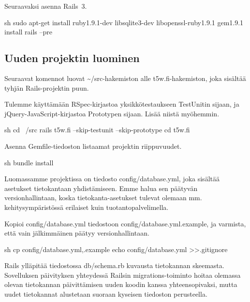 \documentclass{article}
\newcommand{\en}[1]{\foreignlanguage{english}{#1}}
\begin{document}
\begin{samepage}
Seuraavaksi asenna Rails~3.

\begin{pygmented}{sh}
sudo apt-get install ruby1.9.1-dev libsqlite3-dev libopenssl-ruby1.9.1
gem1.9.1 install rails --pre
\end{pygmented}
\end{samepage}

\subsection{Uuden projektin luominen}

\begin{samepage}
Seuraavat komennot luovat \textasciitilde/src-hakemiston alle
t5w.fi-hakemiston, joka sisältää tyhjän Rails-projektin puun.

Tulemme käyttämään RSpec-kirjastoa yksikkötestaukseen TestUnitin sijaan, ja
jQuery-JavaScript-kirjastoa Prototypen sijaan. Lisää niistä myöhemmin.

\begin{pygmented}{sh}
cd ~/src
rails t5w.fi --skip-testunit --skip-prototype
cd t5w.fi
\end{pygmented}
\end{samepage}

\begin{samepage}
Asenna Gemfile-tiedoston listaamat projektin riippuvuudet.

\begin{pygmented}{sh}
bundle install
\end{pygmented}
\end{samepage}

Luomassamme projektissa on tiedosto \en{config/database.yml}, joka sisältää
asetukset tietokantaan yhdistämiseen. Emme halua sen päätyvän
versionhallintaan, koska tietokanta-asetukset tulevat olemaan mm.
kehitysympäristössä erilaiset kuin tuotantopalvelimella.

\begin{samepage}
Kopioi \en{config/database.yml} tiedostoon \en{config/database.yml.example}, ja
varmista, että vain jälkimmäinen päätyy versionhallintaan.

\begin{pygmented}{sh}
cp config/database.yml{,.example}
echo config/database.yml >>.gitignore
\end{pygmented}
\end{samepage}

Rails ylläpitää tiedostossa db/schema.rb kuvausta tietokannan skeemasta.
Sovelluksen päivityksen yhteydessä Railsin migrations-toiminto hoitaa olemassa
olevan tietokannan päivittämisen uuden koodin kanssa yhteensopivaksi, mutta
uudet tietokannat alustetaan suoraan kyseisen tiedoston perusteella.
\end{document}
